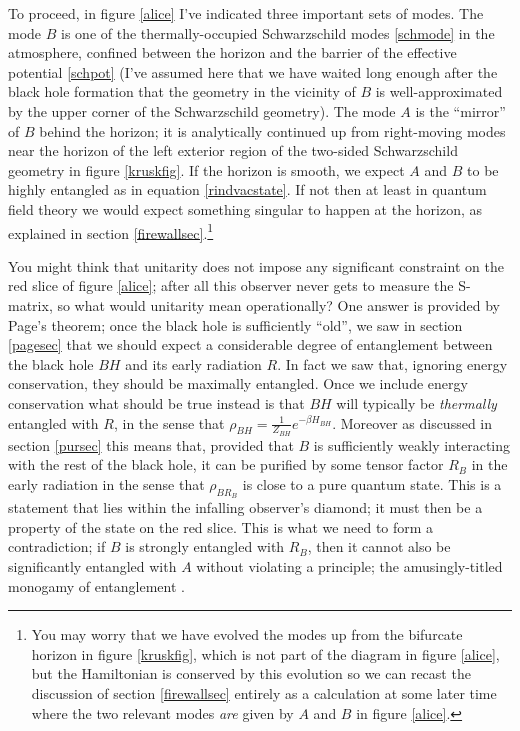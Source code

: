 \documentclass[12pt]{article}
\begin{document}
To proceed, in figure \ref{alice} I've indicated three important sets of modes.  The mode $B$ is one of the thermally-occupied Schwarzschild modes \eqref{schmode} in the atmosphere, confined between the horizon and the barrier of the effective potential \eqref{schpot} (I've assumed here that we have waited long enough after the black hole formation that the geometry in the vicinity of $B$ is well-approximated by the upper corner of the Schwarzschild geometry).  The mode $A$ is the ``mirror'' of $B$ behind the horizon; it is analytically continued up from right-moving modes near the horizon of the left exterior region of the two-sided Schwarzschild geometry in figure \ref{kruskfig}.  If the horizon is smooth, we expect $A$ and $B$ to be highly entangled as in equation \eqref{rindvacstate}.  If not then at least in quantum field theory we would expect something singular to happen at the horizon, as explained in section \ref{firewallsec}.\footnote{You may worry that we have evolved the modes up from the bifurcate horizon in figure \ref{kruskfig}, which is not part of the diagram in figure \ref{alice}, but the Hamiltonian is conserved by this evolution so we can recast the discussion of section \ref{firewallsec} entirely as a calculation at some later time where the two relevant modes \textit{are} given by $A$ and $B$ in figure \ref{alice}.}

You might think that unitarity does not impose any significant constraint on the red slice of figure \ref{alice}; after all this observer never gets to measure the S-matrix, so what would unitarity mean operationally?  One answer is provided by Page's theorem; once the black hole is sufficiently ``old'', we saw in section \ref{pagesec} that we should expect a considerable degree of entanglement between the black hole $BH$ and its early radiation $R$.  In fact we saw that, ignoring energy conservation, they should be maximally entangled.  Once we include energy conservation what should be true instead is that $BH$ will typically be \textit{thermally} entangled with $R$, in the sense that $\rho_{BH}=\frac{1}{Z_{BH}} e^{-\beta H_{BH}}$.  Moreover as discussed in section \ref{pursec} this means that, provided that $B$ is sufficiently weakly interacting with the rest of the black hole, it can be purified by some tensor factor $R_B$ in the early radiation in the sense that $\rho_{BR_B}$ is close to a pure quantum state.  This is a statement that lies within the infalling observer's diamond; it must then be a property of the state on the red slice. This is what we need to form a contradiction; if $B$ is strongly entangled with $R_B$, then it cannot also be significantly entangled with $A$ without violating a principle; the amusingly-titled monogamy of entanglement \cite{koashi2004monogamy}.  
\end{document}
